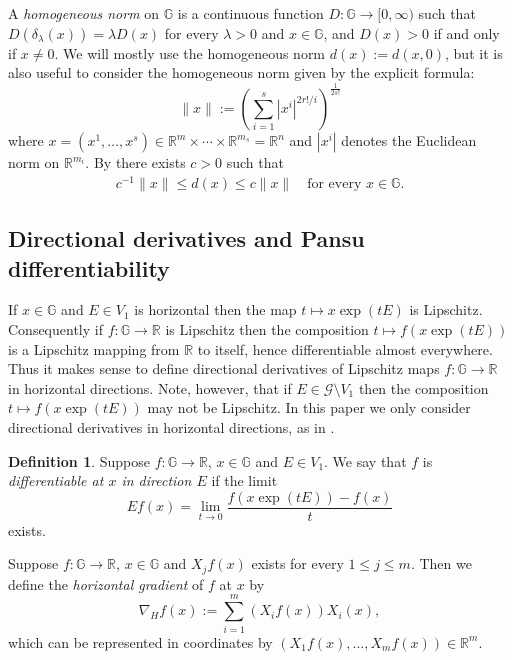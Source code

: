 \documentclass[reqno, 11pt]{amsart}
\theoremstyle{definition}
\newtheorem{definition}[theorem]{Definition}
\theoremstyle{remark}
\numberwithin{theorem}{section}
\numberwithin{equation}{section}
\begin{document}
A \emph{homogeneous norm} on $\mathbb{G}$ is a continuous function $D\colon \mathbb{G}\to [0,\infty)$ such that $D(\delta_{\lambda}(x))=\lambda D(x)$ for every $\lambda>0$ and $x\in \mathbb{G}$, and $D(x)>0$ if and only if $x\neq 0$. We will mostly use the homogeneous norm $d(x):= d(x,0)$, but it is also useful to consider the homogeneous norm given by the explicit formula:
\begin{equation}\label{auxnorm}
\|x\|:=\left( \sum_{i=1}^{s} |x^{i}|^{2r!/i} \right)^{\frac{1}{2s!}}
\end{equation}
where $x=(x^1,\ldots, x^s)\in \mathbb{R}^{m}\times \cdots \times\mathbb{R}^{m_s}=\mathbb{R}^n$ and $|x^i|$ denotes the Euclidean norm on $\mathbb{R}^{m_i}$. By \cite[Proposition 5.1.4]{BLU} there exists $c>0$ such that
\begin{align}\label{equivdist}
c^{-1} \|x\|\leq d(x)\leq c\| x\|\quad \mbox{for every }x\in\mathbb{G}.
\end{align}

\subsection{Directional derivatives and Pansu differentiability}

If $x\in \mathbb{G}$ and $E\in V_{1}$ is horizontal then the map $t\mapsto x\exp(tE)$ is Lipschitz. Consequently if $f\colon \mathbb{G}\to \mathbb{R}$ is Lipschitz then the composition $t\mapsto f(x\exp(tE))$ is a Lipschitz mapping from $\mathbb{R}$ to itself, hence differentiable almost everywhere. Thus it makes sense to define directional derivatives of Lipschitz maps $f\colon \mathbb{G}\to \mathbb{R}$ in horizontal directions. Note, however, that if $E\in \mathcal{G}\setminus V_{1}$ then the composition $t\mapsto f(x\exp(tE))$ may not be Lipschitz. In this paper we only consider directional derivatives in horizontal directions, as in \cite{PinS15}.

\begin{definition}\label{directionalderivative}
Suppose $f\colon \mathbb{G}\to \mathbb{R}$, $x\in \mathbb{G}$ and $E\in V_{1}$. We say that $f$ is \emph{differentiable at $x$ in direction $E$} if the limit
\[Ef(x)=\lim_{t\to 0}\frac{f(x\exp(tE))-f(x)}{t}\]
exists. 
\end{definition}

Suppose $f\colon {\mathbb{G}}\to {\mathbb{R}}$, $x\in \mathbb{G}$ and $X_{j}f(x)$ exists for every $1\leq j\leq m$. Then we define the \emph{horizontal gradient} of $f$ at $x$ by
\begin{equation*}
\nabla_{H}f(x):=\sum_{i=1}^{m}(X_{i}f(x))X_{i}(x),
\end{equation*}
which can be represented in coordinates by $(X_1f(x),...,X_{m}f(x)) \in \mathbb{R}^{m}$.
\end{document}
